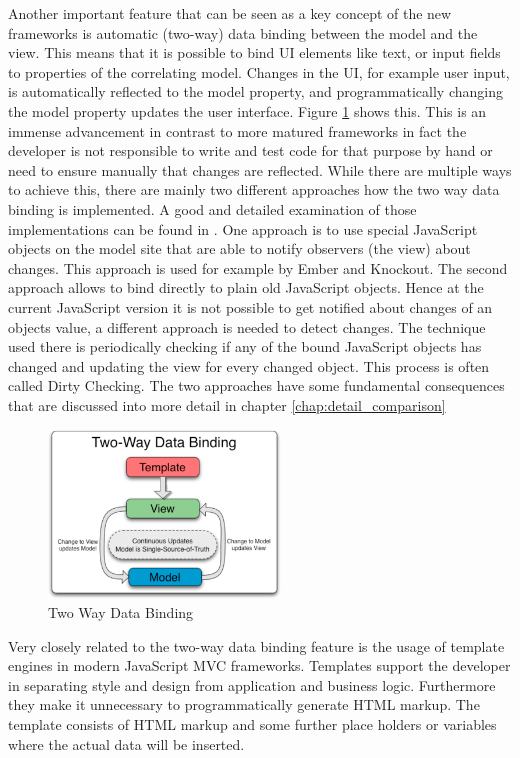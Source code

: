 Another important feature that can be seen as a key concept of the new frameworks is automatic (two-way) data binding between the model and the view.
This means that it is possible to bind UI elements like text, or input fields to properties of the correlating model.
Changes in the UI, for example user input, is automatically reflected to the model property, and programmatically changing the model property updates the user interface. Figure \ref{fig:data-binding} shows this.
This is an immense advancement in contrast to more matured frameworks in fact the developer is not responsible to write and test code for that purpose by hand or need to ensure manually that changes are reflected.
While there are multiple ways to achieve this, there are mainly two different approaches how the two way data binding is implemented.
A good and detailed examination of those implementations can be found in \autocite[]{binding_comparison}.
One approach is to use special JavaScript objects on the model site that are able to notify observers (the view) about changes.
This approach is used for example by Ember and Knockout.
The second approach allows to bind directly to plain old JavaScript objects.
Hence at the current JavaScript version it is not possible to get notified about changes of an objects value, a different approach is needed to detect changes.
The technique used there is periodically checking if any of the bound JavaScript objects has changed and updating the view for every changed object.
This process is often called Dirty Checking.
The two approaches have some fundamental consequences that are discussed into more detail in chapter \ref{chap:detail_comparison}

\begin{figure}
	\centering \includegraphics[width=0.55\textwidth]{./img/web-dev/data-binding.png}
	\caption{Two Way Data Binding \autocite{ng-binding}}
	\label{fig:data-binding}
\end{figure}

Very closely related to the two-way data binding feature is the usage of template engines in modern JavaScript MVC frameworks.
Templates support the developer in separating style and design from application and business logic.
Furthermore they make it unnecessary to programmatically generate HTML markup.
The template consists of HTML markup and some further place holders or variables where the actual data will be inserted.

